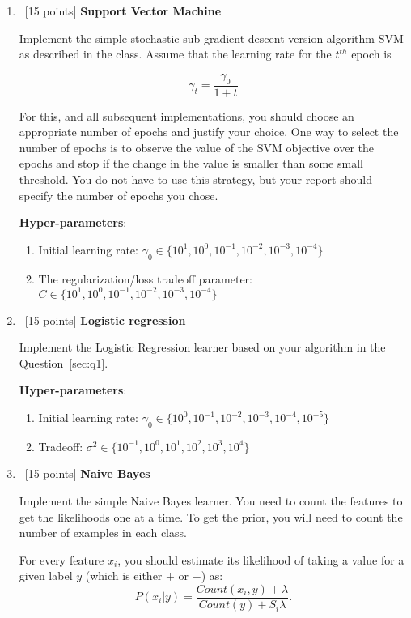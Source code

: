 \begin{enumerate}
\item~[15 points] \textbf{Support Vector Machine}

  Implement the simple stochastic sub-gradient descent version
  algorithm SVM as described in the class. Assume that the learning
  rate for the $t^{th}$ epoch is

  $$\gamma_t = \frac{\gamma_0}{1 + t}$$

  For this, and all subsequent implementations, you should choose an
  appropriate number of epochs and justify your choice. One way to
  select the number of epochs is to observe the value of the SVM
  objective over the epochs and stop if the change in the value is
  smaller than some small threshold. You do not have to use this
  strategy, but your report should specify the number of epochs you
  chose.

  \textbf{Hyper-parameters}: 
  \begin{enumerate}
  \item Initial learning rate: $\gamma_0\in\{10^1, 10^0, 10^{-1}, 10^{-2}, 10^{-3}, 10^{-4}\}$
  \item The regularization/loss tradeoff parameter: $C\in \{10^1, 10^0, 10^{-1}, 10^{-2}, 10^{-3}, 10^{-4}\}$
  \end{enumerate}

  
  
\item~[15 points] \textbf{Logistic regression}

  Implement the Logistic Regression learner based on your algorithm in
  the Question~\ref{sec:q1}.

  \textbf{Hyper-parameters}: 
  \begin{enumerate}
  \item Initial learning rate: $\gamma_0\in\{10^0, 10^{-1}, 10^{-2}, 10^{-3}, 10^{-4}, 10^{-5}\}$
  \item Tradeoff: $\sigma^2\in \{10^{-1}, 10^0, 10^{1}, 10^{2}, 10^{3}, 10^{4}\}$
  \end{enumerate}

\item~[15 points] \textbf{Naive Bayes}

  Implement the simple Naive Bayes learner. You need to count the
  features to get the likelihoods one at a time. To get the prior, you
  will need to count the number of examples in each class.  

  For every feature $x_i$, you should estimate its likelihood of
  taking a value for a given label $y$ (which is either $+$ or $-$)
  as:
  \begin{equation*}
    P(x_i \vert y) = \frac{Count(x_i, y)+\lambda}{Count(y)+S_i\lambda}.
  \end{equation*}


\end{enumerate}
